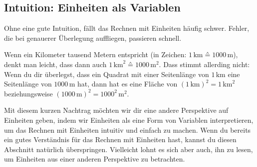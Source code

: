 \documentclass[../../main.tex]{subfiles}
\begin{document}
    \subsection*{Intuition: Einheiten als Variablen}
    Ohne eine gute Intuition, fällt das Rechnen mit Einheiten häufig schwer. Fehler, die bei genauerer Überlegung
    auffliegen, passieren schnell.
    \begin{example}{}
        Wenn ein Kilometer tausend Metern entspricht (in Zeichen: $1\,\text{km} \corresponds 1000\,\text{m}$), denkt man
        leicht, dass dann auch $1\,\text{km}^2 \corresponds 1000\,\text{m}^2$.
        Dass stimmt allerding nicht: Wenn du dir überlegst, dass ein Quadrat mit einer Seitenlänge von $1\,\text{km}$
        eine Seitenlänge von $1000\,\text{m}$ hat, dann hat es eine Fläche von $(1\,\text{km})^2 = 1\,\text{km}^2$
        beziehungsweise $(1000\,\text{m})^2 = 1000^2\,\text{m}^2$.
        \begin{center}
        \end{center}
    \end{example}

    Mit diesem kurzen Nachtrag möchten wir dir eine andere Perspektive auf Einheiten geben, indem wir Einheiten als eine
    Form von Variablen interpretieren, um das Rechnen mit Einheiten intuitiv und einfach zu machen.
    Wenn du bereits ein gutes Verständnis für das Rechnen mit Einheiten hast, kannst du diesen Abschnitt natürlich
    überspringen. Vielleicht lohnt es sich aber auch, ihn zu lesen, um Einheiten aus einer anderen Perspektive zu
    betrachten.
\end{document}
